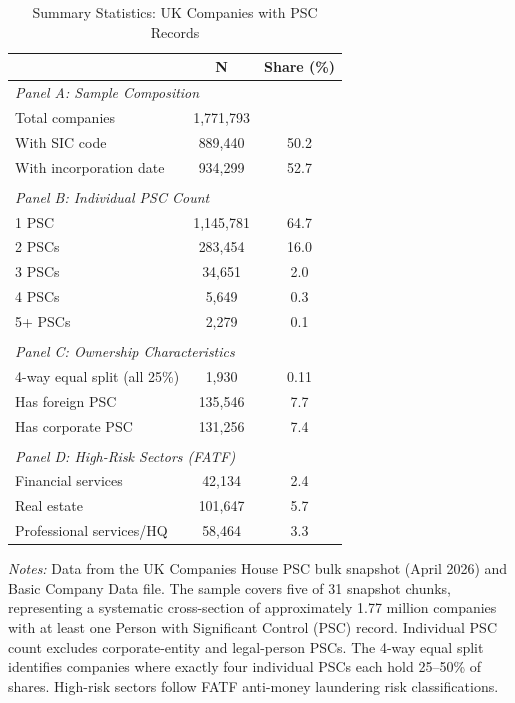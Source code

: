 \begin{table}[t]
\centering
\begin{threeparttable}
\caption{Summary Statistics: UK Companies with PSC Records}
\label{tab:summary}
\begin{tabular}{lcc}
\toprule
 & N & Share (\%) \\
\midrule
\multicolumn{3}{l}{\textit{Panel A: Sample Composition}} \\[3pt]
Total companies & 1,771,793 & \\
\quad With SIC code & 889,440 & 50.2 \\
\quad With incorporation date & 934,299 & 52.7 \\
\\
\multicolumn{3}{l}{\textit{Panel B: Individual PSC Count}} \\[3pt]
1 PSC & 1,145,781 & 64.7 \\
2 PSCs & 283,454 & 16.0 \\
3 PSCs & 34,651 & 2.0 \\
4 PSCs & 5,649 & 0.3 \\
5+ PSCs & 2,279 & 0.1 \\
\\
\multicolumn{3}{l}{\textit{Panel C: Ownership Characteristics}} \\[3pt]
4-way equal split (all 25\%) & 1,930 & 0.11 \\
Has foreign PSC & 135,546 & 7.7 \\
Has corporate PSC & 131,256 & 7.4 \\
\\
\multicolumn{3}{l}{\textit{Panel D: High-Risk Sectors (FATF)}} \\[3pt]
Financial services & 42,134 & 2.4 \\
Real estate & 101,647 & 5.7 \\
Professional services/HQ & 58,464 & 3.3 \\
\bottomrule
\end{tabular}
\begin{tablenotes}[flushleft]\small
\item \textit{Notes:} Data from the UK Companies House PSC bulk snapshot (April 2026) and Basic Company Data file. The sample covers five of 31 snapshot chunks, representing a systematic cross-section of approximately 1.77 million companies with at least one Person with Significant Control (PSC) record. Individual PSC count excludes corporate-entity and legal-person PSCs. The 4-way equal split identifies companies where exactly four individual PSCs each hold 25--50\% of shares. High-risk sectors follow FATF anti-money laundering risk classifications.
\end{tablenotes}
\end{threeparttable}
\end{table}
